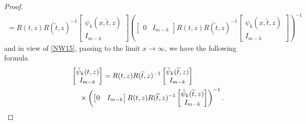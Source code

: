 \documentclass[11pt]{article}
\def\wt{\widetilde}
\numberwithin{equation}{section}
\begin{document}
\begin{proof}
\begin{gather*}
=
R(t,z)R(\wt t,z)^{-1}\begin{bmatrix}\psi_k(x, \wt t,z) \\ I_{m-k} \end{bmatrix} \left(
  \begin{bmatrix}0 &I_{m-k} \end{bmatrix}
 R(t,z)R(\wt t,z)^{-1}\begin{bmatrix}\psi_k(x, \wt t,z) \\ I_{m-k} \end{bmatrix} \right)^{-1}
\end{gather*}
and in view of \eqref{NW15}, passing to the limit $x \to \infty$, we have the following formula{\samepage
\begin{gather}\nonumber
\begin{bmatrix}\breve \psi_k( t,z) \\ I_{m-k} \end{bmatrix}
=
R(t,z)R(\wt t,z)^{-1}\begin{bmatrix}\breve \psi_k( \wt t,z) \\ I_{m-k} \end{bmatrix}
\\ \label{NW33}
\hphantom{\begin{bmatrix}\breve \psi_k( t,z) \\ I_{m-k} \end{bmatrix}
= }{}\times
 \left(
  \begin{bmatrix}0 &I_{m-k} \end{bmatrix}
 R(t,z)R(\wt t,z)^{-1}\begin{bmatrix}\breve \psi_k(\wt t,z) \\ I_{m-k} \end{bmatrix} \right)^{-1}.
\end{gather}}


\end{proof}
\end{document}
